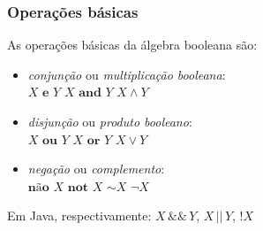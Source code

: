 \documentclass{beamer}
\begin{document}
\begin{frame}
\frametitle{Operações básicas}

\def\spc{ \hspace{4ex} }

As operações básicas da álgebra booleana são:
\begin{itemize}
 \item \emph{conjunção} ou \emph{multiplicação booleana}:\\
       $X \textbf{ e } Y$ \spc $X \textbf{ and } Y$ \spc $X \wedge Y$ \spc
\pause
 \item \emph{disjunção} ou \emph{produto booleano}:\\
       $X \textbf{ ou } Y$ \spc $X \textbf{ or } Y$ \spc $X \vee Y$ \spc
\pause
 \item \emph{negação} ou \emph{complemento}:\\
       $\textbf{não } X$ \spc $\textbf{not }X$ \spc $\sim\!X$ \spc
       $\lnot X$ \spc {}
\end{itemize}
\pause

\vspace{16pt}

Em Java, respectivamente: $X \, \&\& \, Y$,
$X \, || \, Y$, $ !X $
\end{frame}

\end{document}
